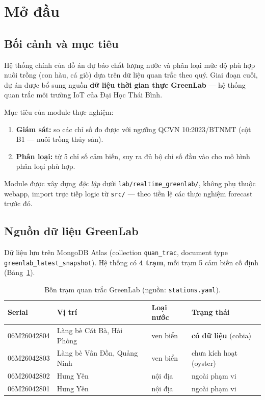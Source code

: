 \section{Mở đầu}

\subsection{Bối cảnh và mục tiêu}
Hệ thống chính của đồ án dự báo chất lượng nước và phân loại mức độ phù hợp nuôi trồng (con hàu, cá giò) dựa trên dữ liệu quan trắc theo quý. Giai đoạn cuối, dự án được bổ sung nguồn \textbf{dữ liệu thời gian thực GreenLab} --- hệ thống quan trắc môi trường IoT của Đại Học Thái Bình.

Mục tiêu của module thực nghiệm:
\begin{enumerate}[nosep]
  \item \textbf{Giám sát:} so các chỉ số đo được với ngưỡng QCVN 10:2023/BTNMT (cột B1 --- nuôi trồng thủy sản).
  \item \textbf{Phân loại:} từ 5 chỉ số cảm biến, suy ra đủ bộ chỉ số đầu vào cho mô hình phân loại phù hợp.
\end{enumerate}

Module được xây dựng \emph{độc lập} dưới \texttt{lab/realtime\_greenlab/}, không phụ thuộc webapp, import trực tiếp logic từ \texttt{src/} --- theo tiền lệ các thực nghiệm forecast trước đó.

\subsection{Nguồn dữ liệu GreenLab}
Dữ liệu lưu trên MongoDB Atlas (collection \texttt{quan\_trac}, document type \texttt{greenlab\_latest\_snapshot}). Hệ thống có \textbf{4 trạm}, mỗi trạm 5 cảm biến cố định (Bảng~\ref{tab:stations}).

\begin{table}[h]
\centering\small
\caption{Bốn trạm quan trắc GreenLab (nguồn: \texttt{stations.yaml}).}
\label{tab:stations}
\begin{tabular}{llll}
\toprule
\textbf{Serial} & \textbf{Vị trí} & \textbf{Loại nước} & \textbf{Trạng thái} \\
\midrule
06M26042804 & Làng bè Cát Bà, Hải Phòng & ven biển & \textbf{có dữ liệu} (cobia) \\
06M26042803 & Làng bè Vân Đồn, Quảng Ninh & ven biển & chưa kích hoạt (oyster) \\
06M26042802 & Hưng Yên & nội địa & ngoài phạm vi \\
06M26042801 & Hưng Yên & nội địa & ngoài phạm vi \\
\bottomrule
\end{tabular}
\end{table}

